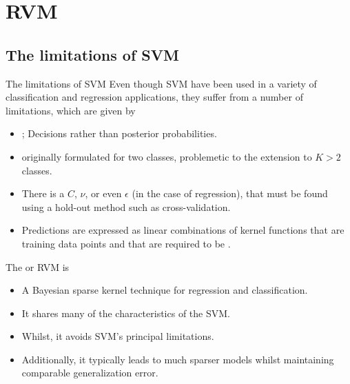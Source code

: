 \documentclass{bredelebeamer}
\begin{document}
\section{RVM}
\subsection{The limitations of SVM}
\begin{frame}{The limitations of SVM}
  Even though SVM have been used in a variety of classification and regression applications,
  they suffer from a number of limitations, which are given by
  \begin{itemize}
    \item {}; Decisions rather than posterior probabilities.
    \item originally formulated for two classes, problemetic to the extension to $K > 2$ classes.
    \item There is a  $C$, $\nu$, or even $\epsilon$ (in the case of regression),
          that must be found using a hold-out method such as cross-validation.
    \item Predictions are expressed as linear combinations of kernel functions
          that are  training data points and
          that are required to be .
  \end{itemize}

  \vspace{1.0\baselineskip}
  The  or RVM is
  \begin{itemize}
    \item A Bayesian sparse kernel technique for regression and classification.
    \item It shares many of the characteristics of the SVM.
    \item Whilst, it avoids SVM's principal limitations.
    \item Additionally, it typically leads to much sparser models whilst
          maintaining comparable generalization error.
  \end{itemize}
\end{frame}
\end{document}

